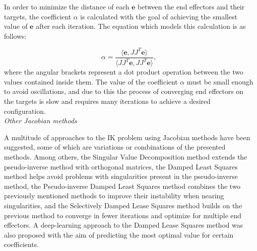 In order to minimize the distance of each \(\mathbf{e}\) between  the end effectors and
their targets, the coefficient \(\alpha\) is calculated with the goal of
achieving the smallest value of \(\mathbf{e}\) after each iteration. The equation
which models this calculation is as follows:

\begin{equation}
    \alpha = \frac
        {
            \langle\mathbf{e}, J J^T \mathbf{e}\rangle
        }
        {
            \langle J J^T \mathbf{e},J J^T \mathbf{e} \rangle
        },
\end{equation}
where the angular brackets represent a dot product operation between the two
values contained inside them. The value of the coefficient \(\alpha\) must be
small enough to avoid oscillations, and due to this the process of converging
end effectors on the targets is slow and requires many iterations to achieve
a desired configuration. \\

\noindent\textit{Other Jacobian methods}

A multitude of approaches to the IK problem using Jacobian methods have been
suggested, some of which are variations or combinations of the presented
methods. Among others, the Singular Value Decomposition method \cite{num_recipes}
extends the pseudo-inverse method with orthogonal matrices, the Damped
Least Squares method \cite{Wampler1986ManipulatorIK} helps avoid problems with
singularities present in the pseudo-inverse method, the Pseudo-inverse Damped
Least Squares method \cite{maciejewski, num_recipes} combines the two previously
mentioned methods to improve their instability when nearing singularities, and
the Selectively Damped Lease Squares method \cite{buss_kim_sdls} builds on the
previous method to converge in fewer iterations and optimize for multiple end
effectors. A deep-learning approach to the Damped Lease Squares method was also
proposed \cite{wang_dldls} with the aim of predicting the most optimal value for
certain coefficients.

